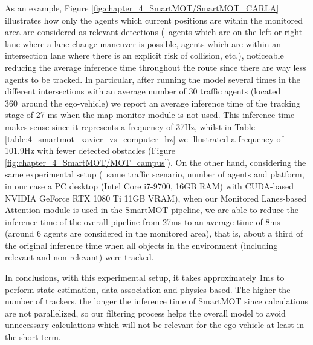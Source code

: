 As an example, Figure \ref{fig:chapter_4_SmartMOT/SmartMOT_CARLA} illustrates how only the agents which current positions are within the monitored area are considered as relevant detections (\ie \ agents which are on the left or right lane where a lane change maneuver is possible, agents which are within an intersection lane where there is an explicit risk of collision, etc.), noticeable reducing the average inference time throughout the route since there are way less agents to be tracked. In particular, after running the model several times in the different intersections with an average number of 30 traffic agents (located 360\degree~around the ego-vehicle) we report an average inference time of the tracking stage of 27 ms when the map monitor module is not used. This inference time makes sense since it represents a frequency of 37Hz, whilst in Table \ref{table:4_smartmot_xavier_vs_computer_hz} we illustrated a frequency of 101.9Hz with fewer detected obstacles (Figure \ref{fig:chapter_4_SmartMOT/MOT_campus}). On the other hand, considering the same experimental setup (\ie \ same traffic scenario, number of agents and platform, in our case a PC desktop (Intel Core i7-9700, 16GB RAM) with CUDA-based NVIDIA GeForce RTX 1080 Ti 11GB VRAM), when our Monitored Lanes-based Attention module is used in the SmartMOT pipeline, we are able to reduce the inference time of the overall pipeline from 27ms to an average time of 8ms (around 6 agents are considered in the monitored area), that is, about a third of the original inference time when all objects in the environment (including relevant and non-relevant) were tracked. 

In conclusions, with this experimental setup, it takes approximately 1ms to perform state estimation, data association and physics-based. The higher the number of trackers, the longer the inference time of SmartMOT since calculations are not parallelized, so our filtering process helps the overall model to avoid unnecessary calculations which will not be relevant for the ego-vehicle at least in the short-term. 

